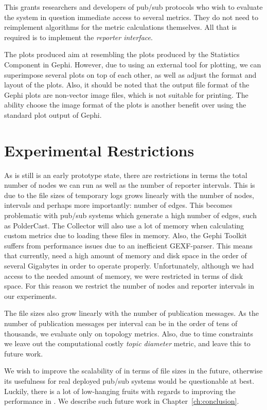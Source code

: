 This grants researchers and developers of pub/sub protocols who wish to evaluate
the system in question immediate access to several metrics. They do not need to
reimplement algorithms for the metric calculations themselves. All that is
required is to implement the \emph{reporter interface}.

The plots produced aim at resembling the plots produced by the
Statistics Component in Gephi. However, due to using an external tool
for plotting, we can superimpose several plots on top of each other, as
well as adjust the format and layout of the plots. Also, it should be
noted that the output file format of the Gephi plots are non-vector
image files, which is not suitable for printing. The ability choose the
image format of the plots is another benefit over using the
standard plot output of Gephi.

\section{Experimental Restrictions}

As \demo{} is still is an early prototype state, there are restrictions
in terms the total number of nodes we can run as well as the number of
reporter intervals. This is due to the file sizes of temporary logs
grows linearly with the number of nodes, intervals and perhaps more
importantly: number of edges. This becomes problematic with pub/sub
systems which generate a high number of edges, such as PolderCast. The
Collector will also use a lot of memory when calculating custom metrics
due to loading these files in memory. Also, the Gephi Toolkit suffers
from performance issues due to an inefficient GEXF-parser. This means
that currently, \demo{} need a high amount of memory and disk space in
the order of several Gigabytes in order to operate properly.
Unfortunately, although we had access to the needed amount of memory, we
were restricted in terms of disk space. For this reason we restrict the
number of nodes and reporter intervals in our experiments.

The file sizes also grow linearly with the number of publication
messages. As the number of publication messages per interval can be in
the order of tens of thousands,  we evaluate only on topology metrics.
Also, due to time constraints we leave out the computational costly
\emph{topic diameter} metric, and leave this to future work.

We wish to improve the scalability of \demo{} in terms of file sizes in
the future, otherwise its usefulness for real deployed pub/sub systems
would be questionable at best. Luckily, there is a lot of low-hanging
fruits with regards to improving the performance in \demo{}. We describe
such future work in Chapter~\ref{ch:conclusion}.


